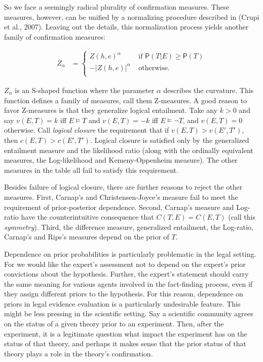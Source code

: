 \documentclass[
  letterpaper,
  DIV=11,
  numbers=noendperiod]{scrartcl}
\newcommand{\n}{\neg}
\newcommand{\pr}[1]{\mathsf{P}(#1)}
\begin{document}
So we face a seemingly radical plurality of confirmation measures. These
measures, however, can be unified by a normalizing procedure described
in (Crupi et al., 2007). Leaving out the details, this normalization
process yields another family of confirmation measures:

\begin{align*}
Z_{\alpha}  & =  \left\{ \begin{array}{lr} 
Z(h, e)^{\alpha} & \mbox{ if } \pr{T\vert E} \geq \pr{T}\\
- |Z(h, e)|^{\alpha} &\mbox { otherwise.}\\
\end{array} \right.
\end{align*}

\noindent \(Z_{\alpha}\) is an S-shaped function where the parameter
\(\alpha\) describes the curvature. This function defines a family of
measures, call them Z-measures. A good reason to favor Z-measures is
that they generalize logical entailment. Take any \(k > 0\) and say
\(v(E,T) =k\) iff \(E\models T\) and \(v(E,T) = -k\) iff
\(E \models \n T\), and \(v(E,T)=0\) otherwise. Call
\emph{logical closure} the requirement that if \(v(E,T) > v(E', T')\),
then \(c(E, T) > c(E' , T' )\). Logical closure is satisfied only by the
generalized entailment measure and the likelihood ratio (along with the
ordinally equivalent measures, the Log-likelihood and Kemeny-Oppenheim
measure). The other measures in the table all fail to satisfy this
requirement.

Besides failure of logical closure, there are further reasons to reject
the other measures. First, Carnap's and Christensen-Joyce's measure fail
to meet the requirement of prior-posterior dependence. Second, Carnap's
measure and Log-ratio have the counterintuitive consequence that
\(C(T,E)= C(E,T)\) (call this \emph{symmetry}). Third, the difference
measure, generalized entailment, the Log-ratio, Carnap's and Rips's
measures depend on the prior of \(T\).

Dependence on prior probabilities is particularly problematic in the
legal setting. For we would like the expert's assessment not to depend
on the expert's prior convictions about the hypothesis. Further, the
expert's statement should carry the same meaning for various agents
involved in the fact-finding process, even if they assign different
priors to the hypothesis. For this reason, dependence on priors in legal
evidence evaluation is a particularly undesirable feature. This might be
less pressing in the scientific setting. Say a scientific community
agrees on the status of a given theory prior to an experiment. Then,
after the experiment, it is a legitimate question what impact the
experiment has on the status of that theory, and perhaps it makes sense
that the prior status of that theory plays a role in the theory's
confirmation.
\end{document}
